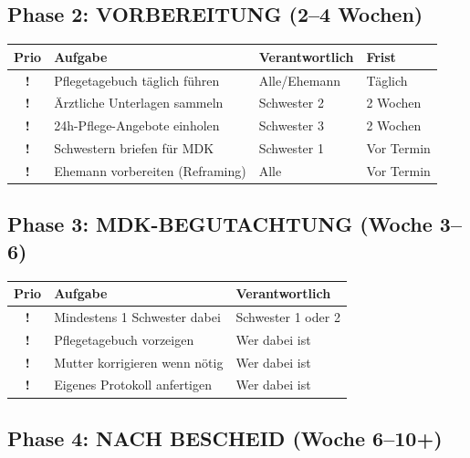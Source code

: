 \documentclass[11pt,a4paper]{article}
\begin{document}
\subsection{Phase 2: VORBEREITUNG (2--4 Wochen)}

\begin{center}
\begin{tabular}{clll}
\toprule
\textbf{Prio} & \textbf{Aufgabe} & \textbf{Verantwortlich} & \textbf{Frist} \\
\midrule
\textcolor{dangerred}{\textbf{!}} & Pflegetagebuch täglich führen & Alle/Ehemann & Täglich \\
\textcolor{dangerred}{\textbf{!}} & Ärztliche Unterlagen sammeln & Schwester 2 & 2 Wochen \\
\textcolor{warningorange}{\textbf{!}} & 24h-Pflege-Angebote einholen & Schwester 3 & 2 Wochen \\
\textcolor{warningorange}{\textbf{!}} & Schwestern briefen für MDK & Schwester 1 & Vor Termin \\
\textcolor{warningorange}{\textbf{!}} & Ehemann vorbereiten (Reframing) & Alle & Vor Termin \\
\bottomrule
\end{tabular}
\end{center}

\subsection{Phase 3: MDK-BEGUTACHTUNG (Woche 3--6)}

\begin{center}
\begin{tabular}{cll}
\toprule
\textbf{Prio} & \textbf{Aufgabe} & \textbf{Verantwortlich} \\
\midrule
\textcolor{dangerred}{\textbf{!}} & Mindestens 1 Schwester dabei & Schwester 1 oder 2 \\
\textcolor{dangerred}{\textbf{!}} & Pflegetagebuch vorzeigen & Wer dabei ist \\
\textcolor{dangerred}{\textbf{!}} & Mutter korrigieren wenn nötig & Wer dabei ist \\
\textcolor{dangerred}{\textbf{!}} & Eigenes Protokoll anfertigen & Wer dabei ist \\
\bottomrule
\end{tabular}
\end{center}

\subsection{Phase 4: NACH BESCHEID (Woche 6--10+)}
\end{document}
